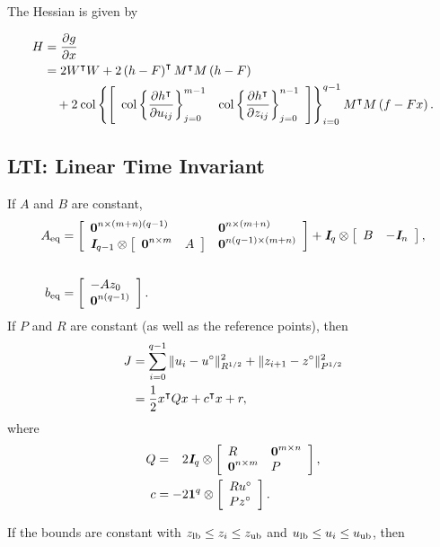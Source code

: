 \documentclass{article}
\begin{document}
    The Hessian is given by

    \begin{align*}
        H&=\frac{\partial g}{\partial x}\\
        &=2W^\intercal W+2\left(h-F\right)^\intercal M^\intercal M\left(h-F\right)\\
        &\quad+
        2\:\text{col}\left\{\left[\begin{array}{lllllllllllllllllll}\text{col}\left\{\dfrac{\partial h^\intercal}{\partial u_{ij}}\right\}_{j=0}^{m-1}&
        \text{col}\left\{\dfrac{\partial h^\intercal}{\partial z_{ij}}\right\}_{j=0}^{n-1}\end{array}\right]\right\}_{i=0}^{q-1}
        M^\intercal M\left(f-Fx\right).
    \end{align*}

    \clearpage
\subsection{LTI: Linear Time Invariant}

    If $A$ and $B$ are constant,
    \begin{align*}
        A_{\text{eq}}&=\left[\begin{array}{lllllllllllllllllll}\textbf{0}^{n\times (m+n)(q-1)} & \textbf{0}^{n\times (m+n)} \\
        \emph{\textbf{I}}_{q-1}\otimes \left[\begin{array}{lllllllllllllllllll}\textbf{0}^{n\times m}&A\end{array}\right] & \textbf{0}^{n(q-1)\times(m+n)} \end{array}\right]+
        \emph{\textbf{I}}_q\otimes\left[\begin{array}{lllllllllllllllllll}B&-\emph{\textbf{I}}_n\end{array}\right],\\\\
        b_{\text{eq}}&=\left[\begin{array}{lllllllllllllllllll}-Az_0\\
        \textbf{0}^{n(q-1)}\end{array}\right].
    \end{align*}
    If $P$ and $R$ are constant (as well as the reference points), then
    \begin{align*}
    J 
    &=\sum_{i=0}^{q-1} \|u_{i}-u^\circ\|_{R^{1/2}}^2+\|z_{i+1}-z^\circ\|_{P^{1/2}}^2  
    \\
    &=  \frac{1}{2}x^\intercal Q x + c^\intercal x+r,
    \end{align*}    
    where
    \begin{align*}
        Q&=\minus2\eye_q\otimes \mat{R&\zeros^{m\times n}\\
            \zeros^{n\times m}&P},\\
        c&=-2\ones^q\otimes \mat{Ru^\circ\\Pz^\circ}.
    \end{align*}

    If the bounds are constant with
    $z_{\text{lb}}\leq z_i \leq z_{\text{ub}}$ and $u_{\text{lb}} \leq u_i \leq u_{\text{ub}}$, then
\end{document}
